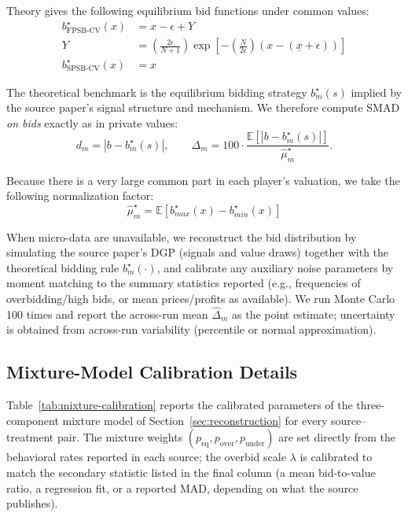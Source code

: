 Theory gives the following equilibrium bid functions under common values:
$$\begin{aligned}
b^\star_{\mathrm{FPSB\text{-}CV}}(x) &= x - \epsilon + Y\\
Y &= \left( \frac{2\epsilon}{N+1} \right) \exp\left[ -\left( \frac{N}{2\epsilon} \right) (x - (\underline{x} + \epsilon)) \right]\\
b^\star_{\mathrm{SPSB\text{-}CV}}(x) &= x
\end{aligned}$$

The theoretical benchmark is the equilibrium bidding strategy $b_m^\star(s)$ implied by the source paper's signal structure and mechanism. We therefore compute SMAD \emph{on bids} exactly as in private values:
\[
d_m = |b - b_m^\star(s)|,
\qquad
\Delta_m = 100\cdot \frac{\mathbb E[|b-b_m^\star(s)|]}{\widehat{\mu}_m^\star}.
\]

Because there is a very large common part in each player's valuation, we take the following normalization factor:
\[
{\widehat{\mu}_m^\star} = \mathbb E[b^\star_{max}(x) - b^\star_{min}(x)]
\]

When micro-data are unavailable, we reconstruct the bid distribution by simulating the source paper's DGP (signals and value draws) together with the theoretical bidding rule $b_m^\star(\cdot)$, and calibrate any auxiliary noise parameters by moment matching to the summary statistics reported (e.g., frequencies of overbidding/high bids, or mean prices/profits as available). We run Monte Carlo 100 times and report the across-run mean $\widehat{\Delta}_m$ as the point estimate; uncertainty is obtained from across-run variability (percentile or normal approximation).

\subsection{Mixture-Model Calibration Details}\label{app:mixture}

Table~\ref{tab:mixture-calibration} reports the calibrated parameters of the three-component mixture model of Section~\ref{sec:reconstruction} for every source--treatment pair. The mixture weights $(p_{\text{eq}}, p_{\text{over}}, p_{\text{under}})$ are set directly from the behavioral rates reported in each source; the overbid scale $\lambda$ is calibrated to match the secondary statistic listed in the final column (a mean bid-to-value ratio, a regression fit, or a reported MAD, depending on what the source publishes).

